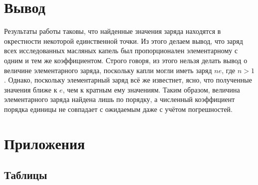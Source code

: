 \documentclass[14pt, a4paper,reqno]{article}
\begin{document}
\section{Вывод}

        Результаты работы таковы, что найденные значения заряда находятся в окрестности некоторой единственной точки.
        Из этого делаем вывод, что заряд всех исследованных масляных капель был пропорционален элементарному с одним и
        тем же коэффициентом. Строго говоря, из этого нельзя делать вывод о величине элементарного заряда, поскольку
        капли могли иметь заряд $ne$, где $n > 1$. Однако, поскольку элементарный заряд всё же известнет, ясно,
        что полученные значения ближе к $e$, чем к кратным ему значениям. Таким образом, величина элементарного
        заряда найдена лишь по порядку, а численный коэффициент порядка единицы не совпадает с ожидаемым даже с учётом
        погрешностей.

\newpage
\section{Приложения}

    \subsection{Таблицы}
\end{document}
